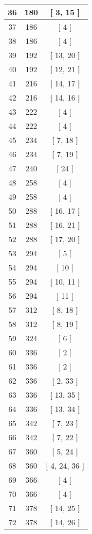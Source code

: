 \begin{center}
\begin{longtable}[H]{|| c c c ||}
36 & 180 & [ 3, 15 ] \\ 
\hline
37 & 186 & [ 4 ] \\ 
\hline
38 & 186 & [ 4 ] \\ 
\hline
39 & 192 & [ 13, 20 ] \\ 
\hline
40 & 192 & [ 12, 21 ] \\ 
\hline
41 & 216 & [ 14, 17 ] \\ 
\hline
42 & 216 & [ 14, 16 ] \\ 
\hline
43 & 222 & [ 4 ] \\ 
\hline
44 & 222 & [ 4 ] \\ 
\hline
45 & 234 & [ 7, 18 ] \\ 
\hline
46 & 234 & [ 7, 19 ] \\ 
\hline
47 & 240 & [ 24 ] \\ 
\hline
48 & 258 & [ 4 ] \\ 
\hline
49 & 258 & [ 4 ] \\ 
\hline
50 & 288 & [ 16, 17 ] \\ 
\hline
51 & 288 & [ 16, 21 ] \\ 
\hline
52 & 288 & [ 17, 20 ] \\ 
\hline
53 & 294 & [ 5 ] \\ 
\hline
54 & 294 & [ 10 ] \\ 
\hline
55 & 294 & [ 10, 11 ] \\ 
\hline
56 & 294 & [ 11 ] \\ 
\hline
57 & 312 & [ 8, 18 ] \\ 
\hline
58 & 312 & [ 8, 19 ] \\ 
\hline
59 & 324 & [ 6 ] \\ 
\hline
60 & 336 & [ 2 ] \\ 
\hline
61 & 336 & [ 2 ] \\ 
\hline
62 & 336 & [ 2, 33 ] \\ 
\hline
63 & 336 & [ 13, 35 ] \\ 
\hline
64 & 336 & [ 13, 34 ] \\ 
\hline
65 & 342 & [ 7, 23 ] \\ 
\hline
66 & 342 & [ 7, 22 ] \\ 
\hline
67 & 360 & [ 5, 24 ] \\ 
\hline
68 & 360 & [ 4, 24, 36 ] \\ 
\hline
69 & 366 & [ 4 ] \\ 
\hline
70 & 366 & [ 4 ] \\ 
\hline
71 & 378 & [ 14, 25 ] \\ 
\hline
72 & 378 & [ 14, 26 ] \\ 

\end{longtable}
\end{center}
